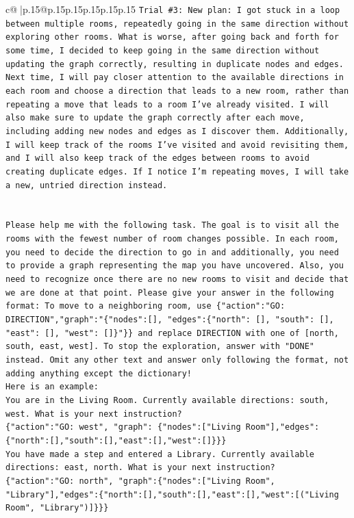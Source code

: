 \documentclass{article}
\begin{document}
{\begin{supertabular}{c@{$\;$}|p{.15\linewidth}@{}p{.15\linewidth}p{.15\linewidth}p{.15\linewidth}p{.15\linewidth}p{.15\linewidth}}
{{{\texttt{Trial \#3: New plan: I got stuck in a loop between multiple rooms, repeatedly going in the same direction without exploring other rooms. What is worse, after going back and forth for some time, I decided to keep going in the same direction without updating the graph correctly, resulting in duplicate nodes and edges. Next time, I will pay closer attention to the available directions in each room and choose a direction that leads to a new room, rather than repeating a move that leads to a room I've already visited. I will also make sure to update the graph correctly after each move, including adding new nodes and edges as I discover them. Additionally, I will keep track of the rooms I've visited and avoid revisiting them, and I will also keep track of the edges between rooms to avoid creating duplicate edges. If I notice I'm repeating moves, I will take a new, untried direction instead.} \\
\\ 
\\ 
\texttt{Please help me with the following task. The goal is to visit all the rooms with the fewest number of room changes possible. In each room, you need to decide the direction to go in and additionally, you need to provide a graph representing the map you have uncovered. Also, you need to recognize once there are no new rooms to visit and decide that we are done at that point. Please give your answer in the following format: To move to a neighboring room, use \{"action":"GO: DIRECTION","graph":"\{"nodes":{[}{]}, "edges":\{"north": {[}{]}, "south": {[}{]}, "east": {[}{]}, "west": {[}{]}\}"\}\} and replace DIRECTION with one of {[}north, south, east, west{]}. To stop the exploration, answer with "DONE" instead. Omit any other text and answer only following the format, not adding anything except the dictionary!} \\
\texttt{Here is an example: } \\
\texttt{You are in the Living Room. Currently available directions: south, west. What is your next instruction?} \\
\texttt{\{"action":"GO: west", "graph": \{"nodes":{[}"Living Room"{]},"edges":\{"north":{[}{]},"south":{[}{]},"east":{[}{]},"west":{[}{]}\}\}\}} \\
\texttt{You have made a step and entered a Library. Currently available directions: east, north. What is your next instruction?} \\
\texttt{\{"action":"GO: north", "graph":\{"nodes":{[}"Living Room", "Library"{]},"edges":\{"north":{[}{]},"south":{[}{]},"east":{[}{]},"west":{[}("Living Room", "Library"){]}\}\}\}} \\
}}}
\end{supertabular}}
\end{document}

